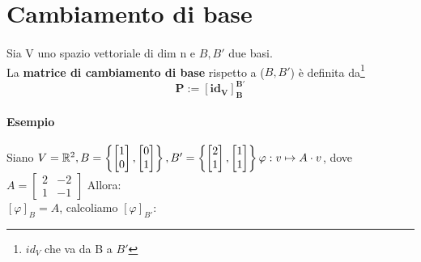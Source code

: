 \documentclass[a4paper, 12pt]{report}
\begin{document}
        \section{Cambiamento di base}
        \paragraph{}Sia V uno spazio vettoriale di dim n e $B, B'$ due basi.\\
        La \textbf{matrice di cambiamento di base} rispetto a ($B,B'$) è definita da\footnote{$id_V$ che va da B a $B'$} $$\boldsymbol{P:=[id_V]^{B'}_B}$$
        \paragraph{Esempio} Siano $V=\mathbb{R}^2, B=\left \{
        \begin{bmatrix}
            1\\
            0
        \end{bmatrix},
        \begin{bmatrix}
            0\\
            1
        \end{bmatrix}
        \right\}
        ,B'=
        \left\{
        \begin{bmatrix}
            2\\
            1    
        \end{bmatrix}
        ,\begin{bmatrix}
            1\\
            1
        \end{bmatrix}
        \right\} \\ \varphi: v \mapsto A \cdot v$, dove $A=
        \begin{bmatrix}
            2 & -2\\
            1 & -1
        \end{bmatrix}$ Allora:\\
        $[\varphi]_B=A$, calcoliamo $[\varphi]_{B'}$:
\end{document}
